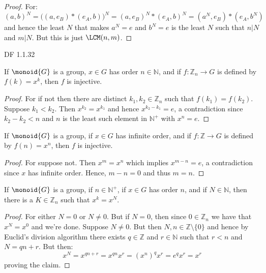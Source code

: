 \documentclass{article}                                                        %
\begin{document}
        \begin{proof}
            For:
            \begin{equation}
                (a,b)^{N}=\big((a,e_{B})*(e_{A},b)\big)^{N}
                =(a,e_{B})^{N}*(e_{A},b)^{N}
                =(a^{N},e_{B})*(e_{A},b^{N})
            \end{equation}
            and hence the least $N$ that makes $a^{N}=e$ and $b^{N}=e$ is the
            least $N$ such that $n|N$ and $m|N$. But this is just $\LCM(n,m)$.
        \end{proof}
        DF 1.1.32
        \begin{theorem}
            If $\monoid{G}$ is a group, $x\in{G}$ has order $n\in\mathbb{N}$,
            and if $f:\mathbb{Z}_{n}\rightarrow{G}$ is defined by
            $f(k)=x^{k}$, then $f$ is injective.
        \end{theorem}
        \begin{proof}
            For if not then there are distinct $k_{1},k_{2}\in\mathbb{Z}_{n}$
            such that $f(k_{1})=f(k_{2})$. Suppose $k_{1}<k_{2}$. Then
            $x^{k_{2}}=x^{k_{1}}$ and hence $x^{k_{2}-k_{1}}=e$, a contradiction
            since $k_{2}-k_{2}<n$ and $n$ is the least such element in
            $\mathbb{N}^{+}$ with $x^{n}=e$.
        \end{proof}
        \begin{theorem}
            If $\monoid{G}$ is a group, if $x\in{G}$ has infinite order, and if
            $f:\mathbb{Z}\rightarrow{G}$ is defined by $f(n)=x^{n}$, then
            $f$ is injective.
        \end{theorem}
        \begin{proof}
            For suppose not. Then $x^{m}=x^{n}$ which implies $x^{m-n}=e$,
            a contradiction since $x$ has infinite order. Hence, $m-n=0$ and
            thus $m=n$.
        \end{proof}
        \begin{theorem}
            If $\monoid{G}$ is a group, if $n\in\mathbb{N}^{+}$, if $x\in{G}$
            has order $n$, and if $N\in\mathbb{N}$, then there is a
            $K\in\mathbb{Z}_{n}$ such that $x^{k}=x^{N}$.
        \end{theorem}
        \begin{proof}
            For either $N=0$ or $N\ne{0}$. But if $N=0$, then since
            $0\in\mathbb{Z}_{n}$ we have that $x^{N}=x^{0}$ and we're done.
            Suppose $N\ne{0}$. But then $N,n\in\mathbb{Z}\setminus\{0\}$ and
            hence by Euclid's division algorithm there exists $q\in\mathbb{Z}$
            and $r\in\mathbb{N}$ such that $r<n$ and $N=qn+r$. But then:
            \begin{equation}
                x^{N}=x^{qn+r}=x^{qn}x^{r}=(x^{n})^{q}x^{r}
                =e^{q}x^{r}=x^{r}
            \end{equation}
            proving the claim.
        \end{proof}
\end{document}
